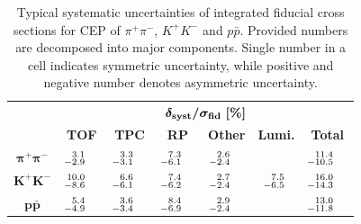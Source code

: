 {
\renewcommand{\arraystretch}{1.5}
\begin{table}[]\centering
\begin{tabular}{c ccccc|c}
 ~ & \multicolumn{6}{c}{  $\bm{ \delta_{\text{\bf{syst}}}/\sigma_{\text{\bf{fid}}}~[\text{\bf{\%}}]}$   } \\
 ~ & \bf{TOF} & \bf{TPC} & \bf{RP} & \bf{Other} & \bf{Lumi.} & \bf{Total} \\ \hline\hline
$\bm{\pi^{+}\pi^{-}}$ & $\prescript{3.1}{-2.9}{~~~}$ & $\prescript{3.3}{-3.1}{~~~}$ & $\prescript{7.3}{-6.1}{~~~}$ & $\prescript{2.6}{-2.4}{~~~}$ & \multirow{3}{*}{$\prescript{7.5}{-6.5}{~}$} & $\prescript{11.4}{-10.5}{~~~}$  \\
$\bm{K^{+}K^{-}}$  & $\prescript{10.0}{-8.6}{~~~}$ & $\prescript{6.6}{-6.1}{~~~}$ & $\prescript{7.4}{-6.2}{~~~}$ & $\prescript{2.7}{-2.4}{~~~}$ &  & $\prescript{16.0}{-14.3}{~~~}$ \\
$\bm{p\bar{p}}$  &  $\prescript{5.4}{-4.9}{~~~}$ & $\prescript{3.6}{-3.4}{~~~}$ & $\prescript{8.4}{-6.9}{~~~}$ & $\prescript{2.9}{-2.4}{~~~}$ &  & $\prescript{13.0}{-11.8}{~~~}$ \\
\end{tabular}
\caption{Typical systematic uncertainties of integrated fiducial cross sections for CEP of $\pi^{+}\pi^{-}$, $K^{+}K^{-}$ and $p\bar{p}$. Provided numbers are decomposed into major components. Single number in a cell indicates symmetric uncertainty, while positive and negative number denotes asymmetric uncertainty.}\label{tab:xSecSyst}
\end{table}
}


